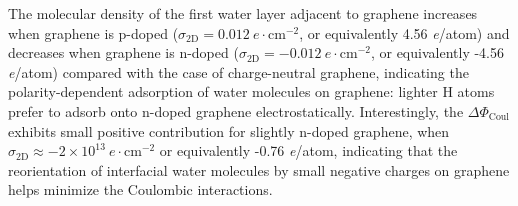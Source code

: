 The molecular density of the first water layer adjacent
to graphene increases when graphene is p-doped
(\(\sigma_{\mathrm{2D}}=0.012\ e\cdot \mathrm{cm}^{-2}\), or
equivalently 4.56 \textit{e}/atom) and decreases when graphene is
n-doped (\(\sigma_{\mathrm{2D}}=-0.012\ e\cdot \mathrm{cm}^{-2}\), or
equivalently -4.56 \textit{e}/atom) compared with the case of
charge-neutral graphene, indicating the polarity-dependent adsorption
of water molecules on graphene: lighter H atoms prefer to adsorb onto
n-doped graphene electrostatically.
%
Interestingly, the
\(\Delta \Phi_{\mathrm{Coul}}\) exhibits small positive contribution
for slightly n-doped graphene, when
\(\sigma_{\mathrm{2D}} \approx -2\times10^{13}\ e\cdot
\mathrm{cm}^{-2}\) or equivalently -0.76 \textit{e}/atom, indicating
that the reorientation of interfacial water molecules by small
negative charges on graphene helps minimize the Coulombic
interactions.

